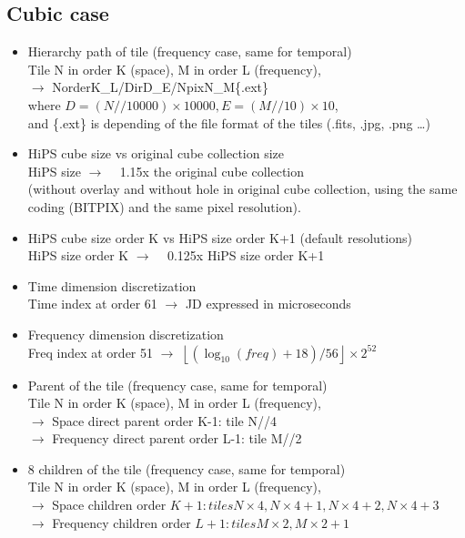 \documentclass[11pt,a4paper]{ivoa}
\begin{document}
\subsection{Cubic case}
\label{sec:cubicFormula}

\begin{itemize}
\item Hierarchy path of tile (frequency case, same for temporal)\\
Tile N in order K (space), M in order L (frequency), \\
$\rightarrow$ NorderK\_L/DirD\_E/NpixN\_M\{.ext\}\\
  where $ D=(N//10000) \times 10000, E=(M//10) \times 10 $,\\
  and \{.ext\} is depending of the file format of the tiles (.fits, .jpg, .png …)
\item HiPS cube size vs original cube collection size\\
HiPS size $\rightarrow$ ~ 1.15x the original cube collection \\
(without overlay and without hole in original cube collection, using the same coding (BITPIX) and the same pixel resolution).
\item HiPS cube size order K vs HiPS size order K+1 (default resolutions)\\
HiPS size order K $\rightarrow$ ~ 0.125x HiPS size order K+1
\item Time dimension discretization\\
Time index at order 61 $\rightarrow$ JD expressed in microseconds
\item Frequency dimension discretization\\
Freq index at order 51  $\rightarrow$  $  \left\lfloor ( \log_{10}(\textit{freq}) + 18 )/ {56} \right\rfloor \times 2^{52} $
\item Parent of the tile (frequency case, same for temporal)\\
Tile N in order K (space), M in order L (frequency),\\
$\rightarrow$ Space direct parent order K-1: tile N//4\\
$\rightarrow$ Frequency direct parent order L-1: tile M//2
\item 8 children of the tile (frequency case, same for temporal)\\
Tile N in order K (space), M in order L (frequency),\\
$\rightarrow$ Space children order $K+1: tiles N \times 4, N \times 4+1, N \times 4+2, N \times 4+3$\\
$\rightarrow$ Frequency children order $L+1: tiles M \times 2, M \times 2+1$


\end{itemize}
\end{document}
